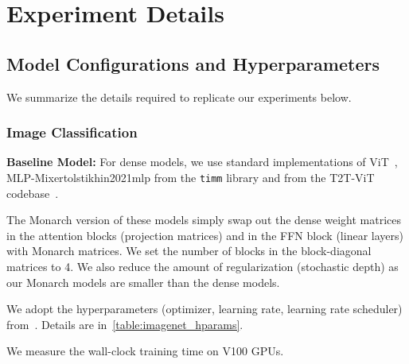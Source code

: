 \section{Experiment Details}
\label{sec:experiment_details}

\subsection{Model Configurations and Hyperparameters}

We summarize the details required to replicate our experiments below.

\subsubsection{Image Classification}

\textbf{Baseline Model:} For dense models, we use standard implementations of
ViT~\citep{dosovitskiy2020image}, MLP-Mixer{tolstikhin2021mlp} from the
\texttt{timm} library and from the T2T-ViT codebase~\citep{yuan2021tokens}.

The Monarch version of these models simply swap out the dense weight matrices in the attention blocks (projection matrices) and in the FFN block (linear layers) with Monarch matrices.
We set the number of blocks in the block-diagonal matrices to 4.
We also reduce the amount of regularization (stochastic depth) as our Monarch models are smaller than the dense models.

We adopt the hyperparameters (optimizer, learning rate, learning rate
scheduler) from~\citet{yuan2021tokens}.
Details are in~\cref{table:imagenet_hparams}.

We measure the wall-clock training time on V100 GPUs.

\begin{table}[!htbp]
 \caption{Configuration of the ImageNet experiment}   
\centering
{}
\label{table:imagenet_hparams}
\end{table}

